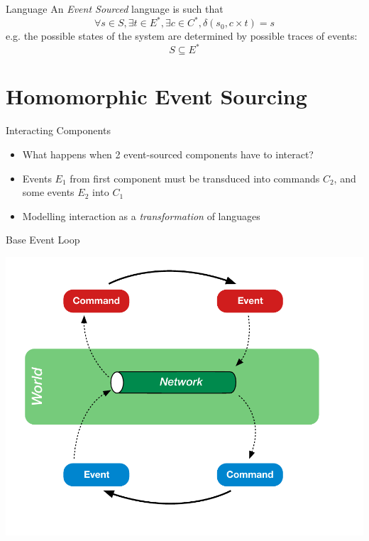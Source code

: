 \begin{frame}[fragile]{Language}
  An \emph{Event Sourced} language is such that
  $$\forall s \in S, \exists t \in E^*, \exists c \in C^*, \delta(s_0,c \times t) = s $$
  e.g. the possible states of the system are determined by possible traces of events:
  $$S \subseteq E^*$$
\end{frame}

\section{Homomorphic Event Sourcing}

\begin{frame}[fragile]{Interacting Components}
  \begin{itemize}
  \item What happens when 2 event-sourced components have to interact?
  \item Events  $E_1$ from first component must be transduced into commands $C_2$, and some events $E_2$ into $C_1$
  \item Modelling interaction as a \emph{transformation} of languages
  \end{itemize}
\end{frame}

\begin{frame}[fragile]{Base Event Loop}
\begin{center}
\includegraphics[height=.8\textheight]{./images/interaction-loop.pdf}
\end{center}
\end{frame}

